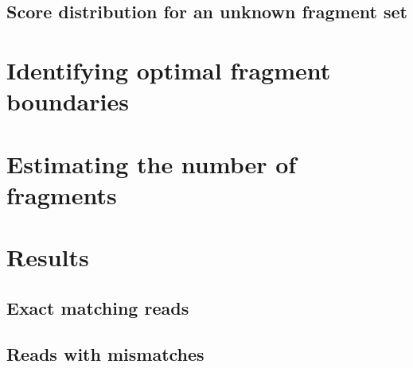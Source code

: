 \subsection{Score distribution for an unknown fragment set}


\section{Identifying optimal fragment boundaries}



\section{Estimating the number of fragments}




\section{Results}


\subsection{Exact matching reads}

\subsection{Reads with mismatches}
